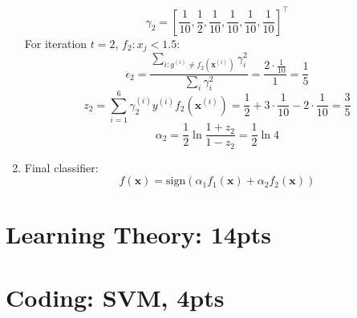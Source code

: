 \documentclass[12pt]{article}
\begin{document}
\begin{enumerate}
    \[\gamma_2 = [\frac{1}{10}, \frac{1}{2}, \frac{1}{10}, \frac{1}{10}, \frac{1}{10}, \frac{1}{10}]^{\top}\]
    For iteration $t=2$, $f_2:x_j<1.5$:
    \[\epsilon_2 = \frac{\sum_{i:y^{(i)}\neq f_2(\boldsymbol{x}^{(i)})}\gamma_i^2}{\sum_i\gamma_i^2} = \frac{2\cdot\frac{1}{10}}{1} = \frac{1}{5}\]
    \[z_2 = \sum_{i=1}^6\gamma_2^{(i)}y^{(i)}f_2(\boldsymbol{x}^{(i)}) = \frac{1}{2} + 3\cdot\frac{1}{10} - 2\cdot\frac{1}{10} = \frac{3}{5}\]
    \[\alpha_2 = \frac{1}{2}\ln\frac{1+z_2}{1-z_2} = \frac{1}{2}\ln4\]
    \item Final classifier:
    \[f(\boldsymbol{x}) = \text{sign}(\alpha_1f_1(\boldsymbol{x}) + \alpha_2f_2(\boldsymbol{x}))\]
\end{enumerate}


\newpage

\section{Learning Theory: 14pts}

\newpage

\section{Coding: SVM, 4pts}
\end{document}
